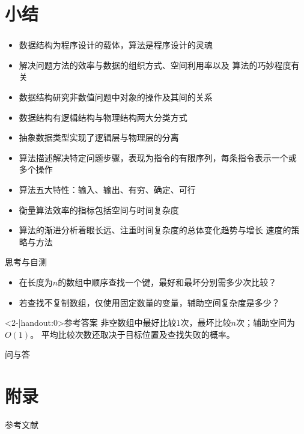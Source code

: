 \section{小结}

\begin{frame}
	\frametitle{\insertsectionhead}
	\begin{itemize}
		\item 数据结构为程序设计的\alert{载体}，算法是程序设计的\alert{灵魂}
		\item 解决问题方法的效率与\alert{数据的组织方式}、\alert{空间利用率}以及
		      \alert{算法的巧妙程度}有关
		\item 数据结构研究\alert{非数值}问题中对象的操作及其间的关系
		\item 数据结构有\alert{逻辑结构}与\alert{物理结构}两大分类方式
		\item 抽象数据类型实现了逻辑层与物理层的分离
		\item 算法描述解决特定问题步骤，表现为指令的有限序列，每条指令表示一个或
		      多个操作
		\item 算法五大特性：输入、输出、有穷、确定、可行
		\item 衡量算法效率的指标包括\alert{空间}与\alert{时间}复杂度
		\item 算法的渐进分析着眼长远、注重时间复杂度的\alert{总体变化趋势}与增长
		      速度的策略与方法
	\end{itemize}
\end{frame}

\begin{frame}{思考与自测}
	\begin{itemize}
		\item 在长度为$n$的数组中顺序查找一个键，最好和最坏分别需多少次比较？
		\item 若查找不复制数组，仅使用固定数量的变量，辅助空间复杂度是多少？
	\end{itemize}
	\pause
	\begin{block}<2-|handout:0>{参考答案}
		非空数组中最好比较$1$次，最坏比较$n$次；辅助空间为$O(1)$。
		平均比较次数还取决于目标位置及查找失败的概率。
	\end{block}
\end{frame}

\begin{standout}[]
	问与答
\end{standout}

\appendix

\section{附录}

\begin{frame}[allowframebreaks]{参考文献}
	
	
\end{frame}